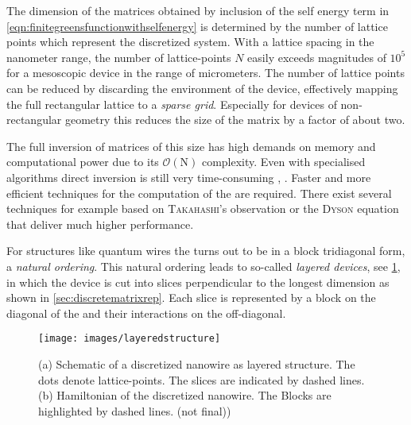 The dimension of the matrices obtained by inclusion of the self energy term in \cref{eqn:finitegreensfunctionwithselfenergy} is determined by the number of lattice points which represent the discretized system.
With a lattice spacing in the nanometer range, the number of lattice-points $N$ easily exceeds magnitudes of $10^5$ for a mesoscopic device in the range of micrometers. 
The number of lattice points can be reduced by discarding the environment of the device, effectively mapping the full rectangular lattice to a \emph{sparse grid}. Especially for devices of non-rectangular geometry this reduces the size of the matrix by a factor of about two.\par
The full inversion of matrices of this size has high demands on memory and computational power due to its $\mathcal{O}(\text{N})$ complexity. Even with specialised algorithms direct inversion is still very time-consuming \cite{Datta2000.2.53}, \cite{Li2009Thesis}. Faster and more efficient techniques for the computation of the \gfnc{} are required. There exist several techniques for example based on \textsc{Takahashi}'s observation \cite{Takahashi1973} or the \textsc{Dyson} equation that deliver much higher performance.\par
For structures like quantum wires the \hamil{} turns out to be in a block tridiagonal form, a \emph{natural ordering}. This natural ordering leads to so-called \emph{layered devices}, see \cref{fig:layered}, in which the device is cut into slices perpendicular to the longest dimension as shown in \cref{sec:discretematrixrep}. Each slice is represented by a block on the diagonal of the \hamil{} and their interactions on the off-diagonal.
\begin{figure}[h!]
\centering
\texttt{[image: images/layeredstructure]}
\caption{(a) Schematic of a discretized nanowire as layered structure. The dots denote lattice-points. The slices are indicated by dashed lines. (b) Hamiltonian of the discretized nanowire. The Blocks are highlighted by dashed lines. (not final))}
\label{fig:layered}
\end{figure}
